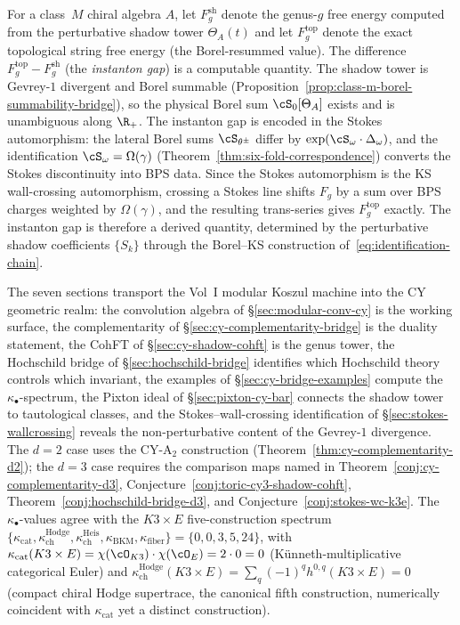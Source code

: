\begin{remark}
\label{rem:instanton-gap-computable}
For a class~$M$ chiral algebra $A$, let $F_g^{\mathrm{sh}}$ denote the genus-$g$ free energy computed from the perturbative shadow tower $\Theta_A(t)$ and let $F_g^{\mathrm{top}}$ denote the exact topological string free energy (the Borel-resummed value). The difference $F_g^{\mathrm{top}} - F_g^{\mathrm{sh}}$ (the \emph{instanton gap}) is a computable quantity. The shadow tower is Gevrey-$1$ divergent and Borel summable (Proposition~\ref{prop:class-m-borel-summability-bridge}), so the physical Borel sum $\cS_0[\Theta_A]$ exists and is unambiguous along $\R_+$. The instanton gap is encoded in the Stokes automorphism: the lateral Borel sums $\cS_{\theta^\pm}$ differ by $\exp(\cS_\omega \cdot \Delta_\omega)$, and the identification $\cS_\omega = \Omega(\gamma)$ (Theorem~\ref{thm:six-fold-correspondence}) converts the Stokes discontinuity into BPS data. Since the Stokes automorphism is the KS wall-crossing automorphism, crossing a Stokes line shifts $F_g$ by a sum over BPS charges weighted by $\Omega(\gamma)$, and the resulting trans-series gives $F_g^{\mathrm{top}}$ exactly. The instanton gap is therefore a derived quantity, determined by the perturbative shadow coefficients $\{S_k\}$ through the Borel--KS construction of~\eqref{eq:identification-chain}.
\end{remark}



The seven sections transport the Vol~I modular Koszul machine into the CY geometric realm: the convolution algebra of \S\ref{sec:modular-conv-cy} is the working surface, the complementarity of \S\ref{sec:cy-complementarity-bridge} is the duality statement, the CohFT of \S\ref{sec:cy-shadow-cohft} is the genus tower, the Hochschild bridge of \S\ref{sec:hochschild-bridge} identifies which Hochschild theory controls which invariant, the examples of \S\ref{sec:cy-bridge-examples} compute the $\kappa_\bullet$-spectrum, the Pixton ideal of \S\ref{sec:pixton-cy-bar} connects the shadow tower to tautological classes, and the Stokes--wall-crossing identification of \S\ref{sec:stokes-wallcrossing} reveals the non-perturbative content of the Gevrey-$1$ divergence. The $d = 2$ case uses the CY-A$_2$ construction (Theorem~\ref{thm:cy-complementarity-d2}); the $d = 3$ case requires the comparison maps named in Theorem~\ref{conj:cy-complementarity-d3}, Conjecture~\ref{conj:toric-cy3-shadow-cohft}, Theorem~\ref{conj:hochschild-bridge-d3}, and Conjecture~\ref{conj:stokes-wc-k3e}. The $\kappa_\bullet$-values agree with the $K3 \times E$ five-construction spectrum $\{\kappa_{\mathrm{cat}}, \kappa_{\mathrm{ch}}^{\mathrm{Hodge}}, \kappa_{\mathrm{ch}}^{\mathrm{Heis}}, \kappa_{\mathrm{BKM}}, \kappa_{\mathrm{fiber}}\} = \{0, 0, 3, 5, 24\}$, with $\kappa_{\mathrm{cat}}(K3 \times E) = \chi(\cO_{K3}) \cdot \chi(\cO_E) = 2 \cdot 0 = 0$ (K\"unneth-multiplicative categorical Euler) and $\kappa_{\mathrm{ch}}^{\mathrm{Hodge}}(K3 \times E) = \sum_q (-1)^q h^{0,q}(K3 \times E) = 0$ (compact chiral Hodge supertrace, the canonical fifth construction, numerically coincident with $\kappa_{\mathrm{cat}}$ yet a distinct construction).



